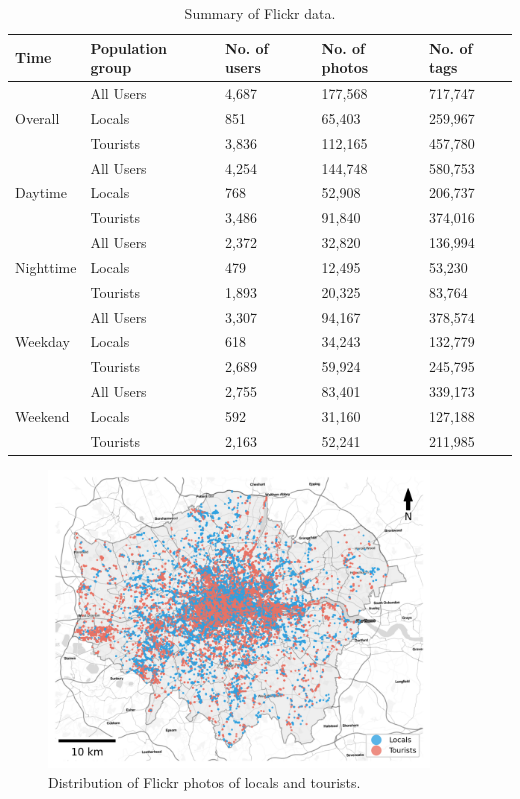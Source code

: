 \documentclass{article}
\theoremstyle{definition}
\theoremstyle{remark}
\begin{document}
\begin{table}[h!]
\centering
\caption{\label{tab:flickr_summary}Summary of Flickr data.}
\begin{tabular}{lllll} \hline
Time & Population group & No. of users & No. of photos & No. of tags \\
\hline
\multirow{3}{*}{Overall} 
& All Users & 4,687 & 177,568 & 717,747 \\
& Locals & 851 & 65,403 & 259,967 \\
& Tourists & 3,836 & 112,165 & 457,780 \\
\hline
\multirow{3}{*}{Daytime} 
& All Users & 4,254 & 144,748 & 580,753 \\
& Locals & 768 & 52,908 & 206,737 \\
& Tourists & 3,486 & 91,840 & 374,016 \\
\hline
\multirow{3}{*}{Nighttime} 
& All Users & 2,372 & 32,820 & 136,994 \\
& Locals & 479 & 12,495 & 53,230 \\
& Tourists & 1,893 & 20,325 & 83,764 \\
\hline
\multirow{3}{*}{Weekday} 
& All Users & 3,307 & 94,167 & 378,574 \\
& Locals & 618 & 34,243 & 132,779 \\
& Tourists & 2,689 & 59,924 & 245,795 \\
\hline
\multirow{3}{*}{Weekend} 
& All Users & 2,755 & 83,401 & 339,173 \\
& Locals & 592 & 31,160 & 127,188 \\
& Tourists & 2,163 & 52,241 & 211,985 \\
\hline
\end{tabular}
\end{table}

\begin{figure}[h!]
\centering
\includegraphics[width=0.9\textwidth]{figures/flickr_distribution.png}
\caption{\label{fig:flickr_distribution}Distribution of Flickr photos of locals and tourists.}
\end{figure}
\end{document}
